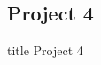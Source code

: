 \documentclass{beamer}
\begin{document}
             
		\subsection{Project 4}
		
		
		\begin{frame}
                \vfill
                \centering
                \begin{beamercolorbox}[sep=8pt,center,shadow=true,rounded=true]{title}
                    Project 4\par%
                \end{beamercolorbox}
                \vfill
             \end{frame}
             
             
   
   		
    
\end{document}
